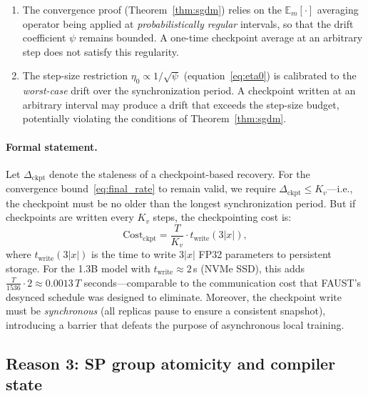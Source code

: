 \documentclass{article}
\begin{document}
\begin{enumerate}
\item The convergence proof (Theorem~\ref{thm:sgdm}) relies on the
$\mathbb{E}_m[\cdot]$ averaging operator being applied at
\emph{probabilistically regular} intervals, so that the drift
coefficient $\psi$ remains bounded. A one-time checkpoint average at
an arbitrary step does not satisfy this regularity.

\item The step-size restriction $\eta_0 \propto 1/\sqrt{\psi}$
(equation~\eqref{eq:eta0}) is calibrated to the \emph{worst-case} drift
over the synchronization period. A checkpoint written at an arbitrary
interval may produce a drift that exceeds the step-size budget,
potentially violating the conditions of Theorem~\ref{thm:sgdm}.
\end{enumerate}

\paragraph{Formal statement.}
Let $\Delta_{\text{ckpt}}$ denote the staleness of a checkpoint-based
recovery. For the convergence bound~\eqref{eq:final_rate} to remain valid,
we require $\Delta_{\text{ckpt}} \leq K_v$---i.e., the checkpoint must be
no older than the longest synchronization period. But if checkpoints are
written every $K_v$ steps, the checkpointing cost is:
\begin{equation}
\text{Cost}_{\text{ckpt}} = \frac{T}{K_v} \cdot t_{\text{write}}(3|x|),
\label{eq:ckpt_cost}
\end{equation}
where $t_{\text{write}}(3|x|)$ is the time to write $3|x|$ FP32
parameters to persistent storage. For the 1.3B model with
$t_{\text{write}} \approx 2$\,s (NVMe SSD), this adds
$\frac{T}{1536} \cdot 2 \approx 0.0013\,T$ seconds---comparable to the
communication cost that FAUST's desynced schedule was designed to
eliminate. Moreover, the checkpoint write must be \emph{synchronous}
(all replicas pause to ensure a consistent snapshot), introducing a
barrier that defeats the purpose of asynchronous local training.

\subsection{Reason 3: SP group atomicity and compiler state}
\label{sec:checkpoint_sp}
\end{document}
